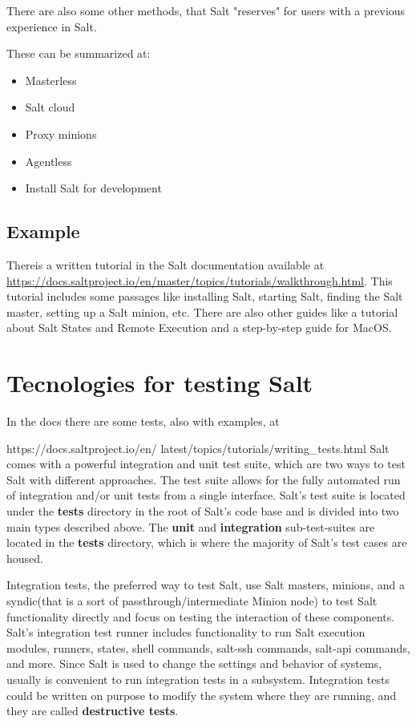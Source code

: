 \documentclass[12pt,a4paper,openright,twoside]{book}
\begin{document}
There are also some other methods, that Salt "reserves" for users with a previous experience in Salt.

These can be summarized at:
\begin{itemize}
    \item Masterless
    \item Salt cloud
    \item Proxy minions
    \item Agentless
    \item Install Salt for development
\end{itemize}

\subsection{Example}
Thereis a written tutorial in the Salt documentation available at \url{https://docs.saltproject.io/en/master/topics/tutorials/walkthrough.html}.
This tutorial includes some passages like installing Salt, starting Salt, finding the Salt master, setting up a Salt minion, etc.
There are also other guides like a tutorial about Salt States and Remote Execution and a step-by-step guide for MacOS.

\section{Tecnologies for testing Salt}
In the docs there are some tests, also with examples, at


https://docs.saltproject.io/en/
latest/topics/tutorials/writing\_tests.html
Salt comes with a powerful integration and unit test suite, which are two ways to test Salt with different approaches.
The test suite allows for the fully automated run of integration and/or unit tests from a single interface.
Salt's test suite is located under the \textbf{tests} directory in the root of Salt's code base and is divided into two main types described above.
The \textbf{unit} and \textbf{integration} sub-test-suites are located in the \textbf{tests} directory, which is where the majority of Salt's test cases are housed.\cite{saltDocTest}


Integration tests, the preferred way to test Salt, use Salt masters, minions, and a syndic(that is a sort of passthrough/intermediate Minion node) to test Salt functionality directly and focus on testing the interaction of these components.
Salt's integration test runner includes functionality to run Salt execution modules, runners, states, shell commands, salt-ssh commands, salt-api commands, and more.
Since Salt is used to change the settings and behavior of systems, usually is convenient to run integration tests in a subsystem.
Integration tests could be written on purpose to modify the system where they are running, and they are called \textbf{destructive tests}\cite{saltDocTest}.
\end{document}
